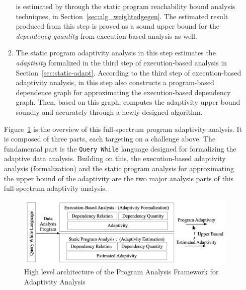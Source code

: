 \begin{enumerate}
\begin{enumerate}
is estimated by {\THESYSTEM} through the static program reachability bound analysis techniques, in Section~\ref{sec:alg_weightedgegen}.
The estimated result produced from 
this step is proved as a sound upper bound for the \emph{dependency quantity} from execution-based analysis as well.
\item 
The static program adaptivity analysis in this step
estimates the \emph{adaptivity} formalized in the third step of execution-based analysis in Section~\ref{sec:static-adapt}.
According to the third step of execution-based adaptivity analysis, 
{\THESYSTEM} in this step also constructs a program-based dependence graph for approximating the execution-based dependency graph.
Then, based on this graph, {\THESYSTEM} 
computes the adaptivity upper bound soundly 
and accurately through a newly designed algorithm.
\end{enumerate}
Figure~\ref{fig:structure} is the overview of this full-spectrum program adaptivity analysis.
It is composed of three parts, each targeting on a challenge above.
The fundamental part is the {\tt Query While} language designed for formalizing the 
adaptive data analysis. Building on this, 
the execution-based adaptivity analysis (formalization)
and the static program analysis for approximating the upper bound of the 
adaptivity are the two major analysis parts of this full-spectrum adaptivity analysis.
\begin{figure}
   \centering   
   \includegraphics[width=1.0\textwidth]{figures/overview.png}
  \caption{High level architecture of the Program Analysis Framework for Adaptivity Analysis}
   \label{fig:structure}
\end{figure}
\end{enumerate}%

